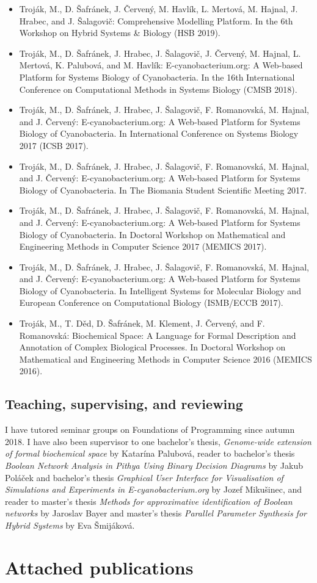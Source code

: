 \documentclass[11pt,a4paper]{report}
\begin{document}
\begin{itemize}
	\item Troják, M., D. Šafránek, J. Červený, M. Havlík, L. Mertová, M. Hajnal, J. Hrabec, and J. Šalagovič: Comprehensive Modelling Platform. In the 6th Workshop on Hybrid Systems \& Biology (HSB 2019).
	\item Troják, M., D. Šafránek, J. Hrabec, J. Šalagovič, J. Červený, M. Hajnal, L. Mertová, K. Palubová, and M. Havlík: E-cyanobacterium.org: A Web-based Platform for Systems Biology of Cyanobacteria. In the 16th International Conference on Computational Methods in Systems Biology (CMSB 2018).
	\item Troják, M., D. Šafránek, J. Hrabec, J. Šalagovič, F. Romanovská, M. Hajnal, and J. Červený: E-cyanobacterium.org: A Web-based Platform for Systems Biology of Cyanobacteria. In International Conference on Systems Biology 2017 (ICSB 2017).
	\item Troják, M., D. Šafránek, J. Hrabec, J. Šalagovič, F. Romanovská, M. Hajnal, and J. Červený: E-cyanobacterium.org: A Web-based Platform for Systems Biology of Cyanobacteria. In The Biomania Student Scientific Meeting 2017.
	\item Troják, M., D. Šafránek, J. Hrabec, J. Šalagovič, F. Romanovská, M. Hajnal, and J. Červený: E-cyanobacterium.org: A Web-based Platform for Systems Biology of Cyanobacteria. In Doctoral Workshop on Mathematical and Engineering Methods in Computer Science 2017 (MEMICS 2017).
	\item Troják, M., D. Šafránek, J. Hrabec, J. Šalagovič, F. Romanovská, M. Hajnal, and J. Červený: E-cyanobacterium.org: A Web-based Platform for Systems Biology of Cyanobacteria. In Intelligent Systems for Molecular Biology and European Conference on Computational Biology (ISMB/ECCB 2017).
	\item Troják, M., T. Děd, D. Šafránek, M. Klement, J. Červený, and F. Romanovská: Biochemical Space: A Language for Formal Description and Annotation of Complex Biological Processes. In Doctoral Workshop on Mathematical and Engineering Methods in Computer Science 2016 (MEMICS 2016).
\end{itemize}

\section{Teaching, supervising, and reviewing}

I have tutored seminar groups on Foundations of Programming since autumn 2018. I have also been supervisor to one bachelor's thesis, \emph{Genome-wide extension of formal biochemical space} by Katarína Palubová, reader to bachelor's thesis \emph{Boolean Network Analysis in Pithya Using Binary Decision Diagrams} by Jakub Poláček and bachelor's thesis \emph{Graphical User Interface for Visualisation of Simulations and Experiments in E-cyanobacterium.org} by Jozef Mikušinec, and reader to master's thesis \emph{Methods for approximative identification of Boolean networks} by Jaroslav Bayer and master's thesis \emph{Parallel Parameter Synthesis for Hybrid Systems} by Eva Šmijáková.

\chapter{Attached publications}




\end{document}
